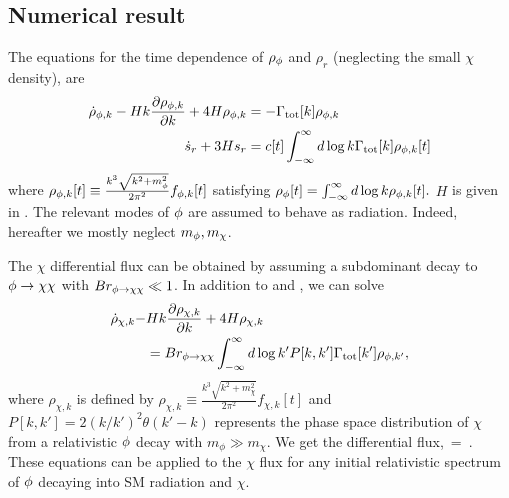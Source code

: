 \documentclass[superscriptaddress,aps,preprintnumbers,amsmath,showpacs,amssymb,prd,nofootinbib,reprint]{revtex4-1}
\begin{document}
{\subsection{Numerical result}
The equations for the time dependence of $\rho_\phi$ and $\rho_r$ (neglecting the small $\chi$ density), are
\begin{align}
\laq{boltz1}
 \dot{\rho}_{\f, k}-Hk \frac{\partial {\rho_{\f, k} }}{\partial k}+4H \rho_{\f, k} &=- \Gamma_{\rm tot}[k] \rho_{\f, k} \\
\laq{boltz2}
\dot{s}_r+3H s_r &= c[t] \int_{-\infty}^{\infty}{d \log k\G_{\rm tot}[k] \rho_{\f, k}}[t]
\end{align}
where 
$
\rho_{\phi,k}[t]\equiv  \frac{k^3 \sqrt{k^2+m_\phi^2}}{2\pi^2}f_{\phi, k} [t]
$
satisfying 
$
\rho_\phi[t]=\int_{-\infty}^{\infty}{d\log 
k}\rho_{\phi,k}[t].
$
$H$ is given in . The relevant modes of $\phi$ are assumed to behave as radiation. Indeed, hereafter we mostly neglect $m_\phi,m_\chi$.

The $\chi$ differential flux can be obtained by assuming a subdominant decay to $\phi\to \chi\chi$ with $Br_{\phi \to \chi\chi}\ll 1$. 
In addition to  and , we  can solve 
\begin{align}
\non
 \dot{\rho}_{\chi,k}-& Hk \frac{\partial {\rho_{\chi,k}}}{\partial k}+4H \rho_{\chi,k}\\
 &=Br_{\f \to \chi\chi}\int_{-\infty}^{\infty}{d \log k' P[k, k'] \Gamma_{\rm tot}[k'] \rho_{\f, k'}},\laq{chiboltz}
\end{align}
where $\rho_{\chi,k}$ is defined by $\rho_{\chi,k} \equiv  \frac{k^3 \sqrt{k^2+m_\chi^2}}{2\pi^2}f_{\chi,k}[t]$
and 
$
P[k, k']= 2 (k/k')^{2}\theta{(k'-k)}
$
represents the  phase space distribution of $\chi$ from a relativistic $\phi$ decay with $m_\phi\gg m_\chi$. 
We get the differential flux, 
\beq
{}\,=\, .
\eeq
These equations can be applied to the $\chi$ flux for any initial relativistic spectrum of $\phi$ decaying into SM radiation and $\chi$.



}
\end{document}
